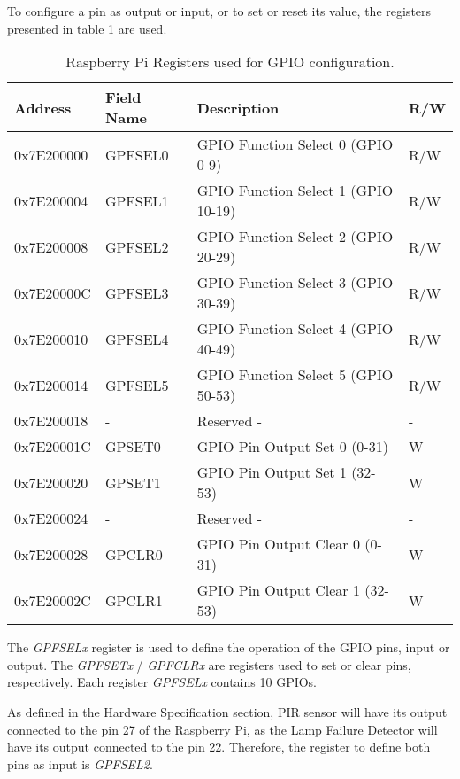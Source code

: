 To configure a pin as output or input, or to set or reset its value, the registers presented in table \ref{table:gpio_reg} are used.

\begin{table}[H]
	\centering
	\resizebox{\columnwidth}{!}
	{
		\begin{tabular}{|m{}|m{}|m{}|m{}|}
			\hline
			\textbf{Address} & \textbf{Field Name} & \textbf{Description} & \textbf{R/W}
			\\\hline\hline
			0x7E200000 & GPFSEL0 & GPIO Function Select 0 (GPIO 0-9) &  R/W
			\\\hline
			
			0x7E200004 & GPFSEL1 & GPIO Function Select 1 (GPIO 10-19) & R/W
			\\\hline
			
			0x7E200008 & GPFSEL2 & GPIO Function Select 2 (GPIO 20-29) & R/W
			\\\hline
			
			0x7E20000C & GPFSEL3 & GPIO Function Select 3 (GPIO 30-39) & R/W
			\\\hline
			
			0x7E200010 & GPFSEL4 & GPIO Function Select 4 (GPIO 40-49) & R/W
			\\\hline
			
			0x7E200014 & GPFSEL5 & GPIO Function Select 5 (GPIO 50-53) & R/W
			\\\hline
			
			0x7E200018 & - & Reserved - & -
			\\\hline
			
			0x7E20001C & GPSET0 & GPIO Pin Output Set 0 (0-31) & W
			\\\hline
			
			0x7E200020 & GPSET1 & GPIO Pin Output Set 1 (32-53) & W
			\\\hline
			
			0x7E200024 & - & Reserved - & -
			\\\hline
			
			0x7E200028 & GPCLR0 & GPIO Pin Output Clear 0 (0-31) & W
			\\\hline
			
			0x7E20002C & GPCLR1 & GPIO Pin Output Clear 1 (32-53) & W
			\\\hline			
		\end{tabular}
	}
	\caption{Raspberry Pi Registers used for GPIO configuration.}
	\label{table:gpio_reg}
\end{table}

The \textit{GPFSELx} register is used to define the operation of the GPIO pins, input or output. The \textit{GPFSETx} / \textit{GPFCLRx} are registers used to set or clear pins, respectively. Each register \textit{GPFSELx} contains 10 GPIOs.

As defined in the Hardware Specification section, PIR sensor will have its output connected to the pin 27 of the Raspberry Pi, as the Lamp Failure Detector will have its output connected to the pin 22. Therefore, the register to define both pins as input is \textit{GPFSEL2}.
